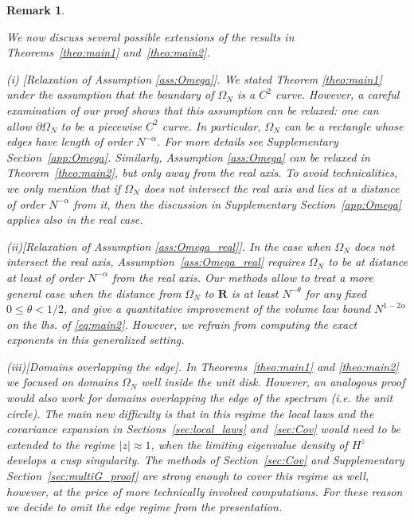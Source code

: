 \documentclass[10pt]{amsart}
\newtheorem{remark}[theorem]{Remark}
\numberwithin{equation}{section}
\newcommand{\R}{\mathbf{R}}
\begin{document}
\begin{remark}
\label{rem:impr}

We now discuss several possible extensions of the results in Theorems~\ref{theo:main1} and~\ref{theo:main2}.

\smallskip

\emph{(i) [Relaxation of Assumption \ref{ass:Omega}].} We stated Theorem \ref{theo:main1} under the assumption that the boundary of $\Omega_N$ is a $C^2$ curve. However, a careful examination of our proof shows that this assumption can be relaxed: one can allow $\partial\Omega_N$ to be a piecewise $C^2$ curve. In particular, $\Omega_N$ can be a rectangle whose edges have length of order $N^{-\alpha}$. For more details see Supplementary Section~\ref{app:Omega}. Similarly, Assumption \ref{ass:Omega} can be relaxed in Theorem~\ref{theo:main2}, but only away from the real axis. To avoid technicalities, we only mention that if $\Omega_N$ does not intersect the real axis and lies at a distance of order $N^{-\alpha}$ from it, then the discussion in Supplementary Section~\ref{app:Omega} applies also in the real case.

\smallskip

\emph{(ii)[Relaxation of Assumption \ref{ass:Omega_real}].} In the case when $\Omega_N$ does not intersect the real axis,  Assumption~\ref{ass:Omega_real} requires $\Omega_N$ to be at distance at least of order $N^{-\alpha}$ from the real axis. Our methods allow to treat a more general case when the distance from $\Omega_N$ to $\R$ is at least $N^{-\theta}$ for any fixed $0\le \theta<1/2$, and give a quantitative improvement of the volume law bound $N^{1-2\alpha}$ on the lhs. of \eqref{eq:main2}. However, we refrain from computing the exact exponents in this generalized setting.

\smallskip

\emph{(iii)[Domains overlapping the edge].} In Theorems~\ref{theo:main1} and \ref{theo:main2} we focused on domains $\Omega_N$ well inside the unit disk. However, an analogous proof would also work for domains overlapping the edge of the spectrum (i.e. the unit circle). The main new difficulty is that in this regime the local laws and the covariance expansion in Sections~\ref{sec:local_laws} and~\ref{sec:Cov} would need to be extended to the regime $|z|\approx 1$, when the limiting eigenvalue density of $H^z$ develops a cusp singularity. The methods of Section~\ref{sec:Cov} and Supplementary Section~\ref{sec:multiG_proof} are strong enough to cover this regime as well, however, at the price of more technically involved computations. For these reason we decide to omit the edge regime from the presentation.


\end{remark}
\end{document}
